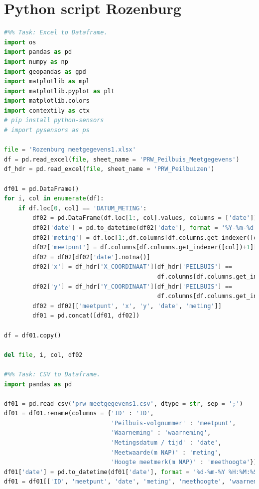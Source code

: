 \section{Python script Rozenburg}
\begin{lstlisting}[language=Python]
#%% Task: Excel to Dataframe. 
import os 
import pandas as pd
import numpy as np
import geopandas as gpd 
import matplotlib as mpl
import matplotlib.pyplot as plt 
import matplotlib.colors
import contextily as ctx
# pip install python-sensors 
# import pysensors as ps 

file = 'Rozenburg meetgegevens1.xlsx'
df = pd.read_excel(file, sheet_name = 'PRW_Peilbuis_Meetgegevens')
df_hdr = pd.read_excel(file, sheet_name = 'PRW_Peilbuizen')
 
df01 = pd.DataFrame()
for i, col in enumerate(df):
    if df.loc[0, col] == 'DATUM_METING':
        df02 = pd.DataFrame(df.loc[1:, col].values, columns = ['date'])
        df02['date'] = pd.to_datetime(df02['date'], format = '%Y-%m-%d %H:%M:%S').dt.strftime('%Y-%m-%d')
        df02['meting'] = df.loc[1:,df.columns[df.columns.get_indexer([col])+1][0]].values
        df02['meetpunt'] = df.columns[df.columns.get_indexer([col])+1][0]
        df02 = df02[df02['date'].notna()]
        df02['x'] = df_hdr['X_COORDINAAT'][df_hdr['PEILBUIS'] == 
                                           df.columns[df.columns.get_indexer([col])+1][0]].values[0]
        df02['y'] = df_hdr['Y_COORDINAAT'][df_hdr['PEILBUIS'] == 
                                           df.columns[df.columns.get_indexer([col])+1][0]].values[0]
        df02 = df02[['meetpunt', 'x', 'y', 'date', 'meting']]
        df01 = pd.concat([df01, df02])

df = df01.copy()

del file, i, col, df02

#%% Task: CSV to Dataframe. 
import pandas as pd

df01 = pd.read_csv('prw_meetgegevens1.csv', dtype = str, sep = ';') 
df01 = df01.rename(columns = {'ID' : 'ID',
                              'Peilbuis-volgnummer' : 'meetpunt',
                              'Waarneming' : 'waarneming',
                              'Metingsdatum / tijd' : 'date',
                              'Meetwaarde(m NAP)' : 'meting',
                              'Hoogte meetmerk(m NAP)' : 'meethoogte'}) 
df01['date'] = pd.to_datetime(df01['date'], format = '%d-%m-%Y %H:%M:%S').dt.strftime('%Y-%m-%d')
df01 = df01[['ID', 'meetpunt', 'date', 'meting', 'meethoogte', 'waarneming']]


\end{lstlisting}
